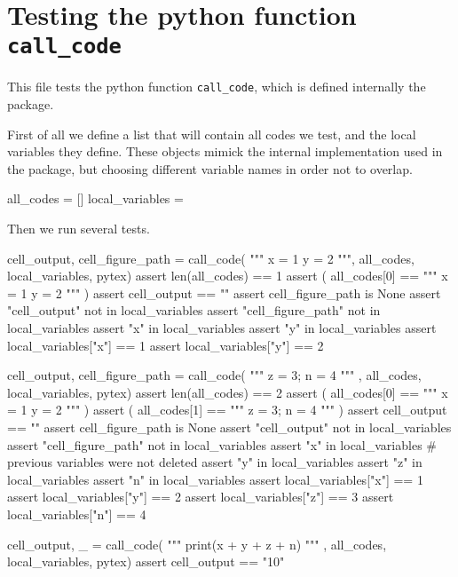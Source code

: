 \documentclass{book}
\begin{document}
\chapter{Testing the python function \texttt{call\_code}}

This file tests the python function \texttt{call\_code}, which is defined internally the package.

First of all we define a list that will contain all codes we test, and the local variables they define. These objects mimick the internal implementation used in the package, but choosing different variable names in order not to overlap.

\begin{pycell}
all_codes = []
local_variables = {}
\end{pycell}

Then we run several tests.

\begin{pycell}
cell_output, cell_figure_path = call_code(
"""
x = 1
y = 2
""",
all_codes, local_variables, pytex)
assert len(all_codes) == 1
assert (
    all_codes[0] == """
x = 1
y = 2
"""
)
assert cell_output == ""
assert cell_figure_path is None
assert "cell_output" not in local_variables
assert "cell_figure_path" not in local_variables
assert "x" in local_variables
assert "y" in local_variables
assert local_variables["x"] == 1
assert local_variables["y"] == 2
\end{pycell}

\begin{pycell}
cell_output, cell_figure_path = call_code(
"""
z = 3; n = 4
"""
,
all_codes, local_variables, pytex)
assert len(all_codes) == 2
assert (
    all_codes[0] == """
x = 1
y = 2
"""
)
assert (
    all_codes[1] == """
z = 3; n = 4
"""
)
assert cell_output == ""
assert cell_figure_path is None
assert "cell_output" not in local_variables
assert "cell_figure_path" not in local_variables
assert "x" in local_variables  # previous variables were not deleted
assert "y" in local_variables
assert "z" in local_variables
assert "n" in local_variables
assert local_variables["x"] == 1
assert local_variables["y"] == 2
assert local_variables["z"] == 3
assert local_variables["n"] == 4
\end{pycell}

\begin{pycell}
cell_output, _ = call_code(
"""
print(x + y + z + n)
"""
,
all_codes, local_variables, pytex)
assert cell_output == "10"
\end{pycell}
\end{document}
